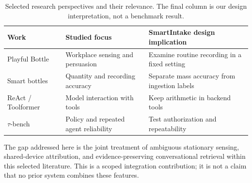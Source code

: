 \begin{table}[t]
\caption{Selected research perspectives and their relevance. The final column is our design interpretation, not a benchmark result.}\label{tab:related}
\centering\footnotesize\setlength{\tabcolsep}{4pt}
\begin{tabular}{@{}p{}p{}p{}@{}}\toprule
Work & Studied focus & SmartIntake design implication\\\midrule
Playful Bottle~\cite{chiu2009} & Workplace sensing and persuasion & Examine routine recording in a fixed setting\\
Smart bottles~\cite{cohen2022} & Quantity and recording accuracy & Separate mass accuracy from ingestion labels\\
ReAct / Toolformer~\cite{yao2023react,schick2023} & Model interaction with tools & Keep arithmetic in backend tools\\
$\tau$-bench~\cite{yao2024tau} & Policy and repeated agent reliability & Test authorization and repeatability\\\bottomrule
\end{tabular}
\end{table}

The gap addressed here is the joint treatment of ambiguous stationary sensing, shared-device attribution, and evidence-preserving conversational retrieval within this selected literature. This is a scoped integration contribution; it is not a claim that no prior system combines these features.
